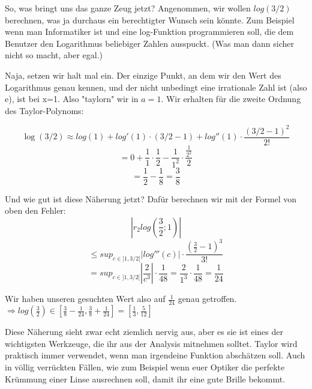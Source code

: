\begin{example}
So, was bringt uns das ganze Zeug jetzt?
Angenommen, wir wollen $log(3/2)$ berechnen, was ja durchaus ein berechtigter Wunsch sein könnte. Zum Beispiel wenn man Informatiker ist und eine log-Funktion programmieren soll, die dem Benutzer den Logarithmus beliebiger Zahlen ausspuckt. (Was man dann sicher nicht so macht, aber egal.)

Naja, setzen wir halt mal ein. Der einzige Punkt, an dem wir den Wert des Logarithmus genau kennen, und der nicht unbedingt eine irrationale Zahl ist (also e), ist bei x=1.
Also "taylorn" wir in $a=1$.
Wir erhalten für die zweite Ordnung des Taylor-Polynoms:

$$\log(3/2) \approx log(1) + log'(1)\cdot(3/2 - 1) + log''(1)\cdot\frac{(3/2-1)^2}{2!}$$
$$= 0 + \frac{1}{1}\cdot\frac{1}{2} - \frac{1}{1^2}\cdot\frac{\frac{1}{2^2}}{2}$$
$$= \frac{1}{2} - \frac{1}{8} = \frac{3}{8}$$

Und wie gut ist diese Näherung jetzt? Dafür berechnen wir mit der Formel von oben den Fehler:
$$|r_2log(\frac{3}{2};1)|$$
$$\leq sup_{c \in ]1,3/2[}|log'''(c)|\cdot\frac{(\frac{3}{2}-1)^{3}}{3!}$$
$$= sup_{c \in ]1,3/2[}|\frac{2}{c^3}|\cdot \frac{1}{48} = \frac{2}{1^3}\cdot\frac{1}{48} = \frac{1}{24}$$

Wir haben unseren gesuchten Wert also auf $\frac{1}{24}$ genau getroffen.
$\Rightarrow log(\frac{3}{2})\in [\frac{3}{8}-\frac{1}{24}, \frac{3}{8}+\frac{1}{24}] = [\frac{1}{3}, \frac{5}{12}]$
\end{example}

\begin{concept}
Diese Näherung sieht zwar echt ziemlich nervig aus, aber es sie ist eines der wichtigsten Werkzeuge, die ihr aus der Analysis mitnehmen solltet. Taylor wird praktisch immer verwendet, wenn man irgendeine Funktion abschätzen soll. Auch in völlig verrückten Fällen, wie zum Beispiel wenn euer Optiker die perfekte Krümmung einer Linse ausrechnen soll, damit ihr eine gute Brille bekommt.
\end{concept}
